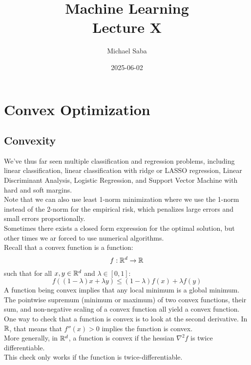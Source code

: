\documentclass[12pt]{article}
\title{%
    \Huge Machine Learning \\
    \Large Lecture X
}
\date{2025-06-02}
\author{Michael Saba}
\begin{document}
\maketitle
\newpage
\setlength{\parindent}{0pt}

\section*{Convex Optimization}
\subsection*{Convexity}

We've thus far seen multiple classification and regression
problems, including linear classification,
linear classification with ridge or LASSO regression,
Linear Discriminant Analysis, Logistic Regression,
and Support Vector Machine with hard and soft margins. \\

Note that we can also use least 1-norm minimization
where we use the 1-norm instead of the 2-norm 
for the empirical risk, which penalizes large
errors and small errors proportionally. \\

Sometimes there exists a closed form expression for 
the optimal solution, but other times we ar forced to use
numerical algorithms. \\

Recall that a convex function is a function:
\[ f: \mathbb{R}^d \to \mathbb{R} \]
such that for all $x, y \in \mathbb{R}^d$ and $\lambda \in [0, 1]$:
\[ f((1-\lambda)x + \lambda y) 
\leq (1-\lambda)f(x) + \lambda f(y)  \]
A function being convex implies that any local minimum
is a global minimum. \\

The pointwise supremum (minimum or maximum) of two 
convex functions, their sum, and non-negative
scaling of a convex function all yield a convex function. \\

One way to check that a function is convex
is to look at the second derivative.
In $\mathbb{R}$, that means that
$f''(x) > 0$ implies the function is convex. \\
More generally, in $\mathbb{R}^d$, 
a function is convex if the hessian $\nabla^2 f$
is twice differentiable. \\
This check only works if the function 
is twice-differentiable. \\
\end{document}

